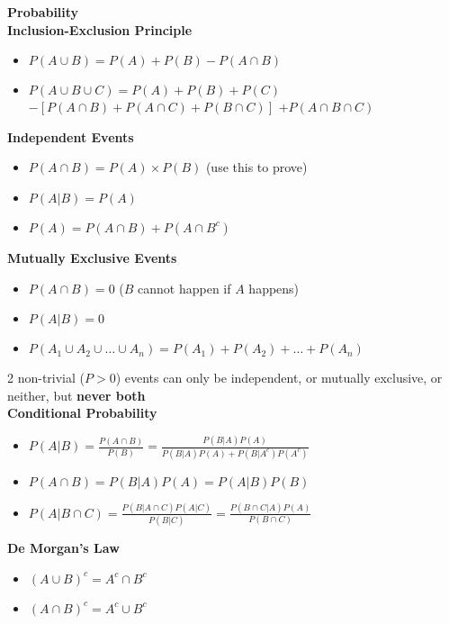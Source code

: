 \documentclass[a4paper, 12pt]{article}
\begin{document}
\begin{multicols*}{4}
{\small\textbf{Probability}} \\
\textbf{Inclusion-Exclusion Principle}
\begin{itemize}
    \item $P(A \cup B) = P(A) + P(B) - P(A \cap B)$
    \item $P(A \cup B \cup C) = P(A) + P(B) + P(C)$
    $- [P(A \cap B) + P(A \cap C) + P(B \cap C)]$
    $+ P(A \cap B \cap C)$
\end{itemize}
\textbf{Independent Events}
\begin{itemize}
    \item $P(A \cap B) = P(A) \times P(B)$ (use this to prove)
    \item $P(A|B) = P(A)$
    \item $P(A) = P(A \cap B) + P(A \cap B^c)$
\end{itemize}
\textbf{Mutually Exclusive Events}
\begin{itemize}
    \item $P(A \cap B) = 0$ ($B$ cannot happen if $A$ happens)
    \item $P(A|B) = 0$
    \item $P(A_1 \cup A_2 \cup \ldots \cup A_n) = P(A_1) + P(A_2) + \ldots + P(A_n)$
\end{itemize}
2 non-trivial ($P > 0$) events can only be independent, or mutually exclusive, or neither, but \textbf{never both}\\
\textbf{Conditional Probability}
\begin{itemize}
    \item $P(A|B) = \frac{P(A \cap B)}{P(B)} = \frac{P(B|A)P(A)}{P(B|A)P(A) + P(B|A^c)P(A^c)}$
    \item $P(A \cap B) = P(B|A)P(A) = P(A|B)P(B)$
    \item $P(A|B \cap C) = \frac{P(B|A \cap C)P(A|C)}{P(B|C)} = \frac{P(B \cap C|A)P(A)}{P(B \cap C)}$
\end{itemize}
\textbf{De Morgan's Law} \\
\begin{minipage}{.5\linewidth}
    \begin{itemize}
        \item $(A \cup B)^c = A^c \cap B^c$
    \end{itemize}
\end{minipage}
\begin{minipage}{.5\linewidth}
    \begin{itemize}
        \item $(A \cap B)^c = A^c \cup B^c$
    \end{itemize}

\end{minipage}
\end{multicols*}
\end{document}
